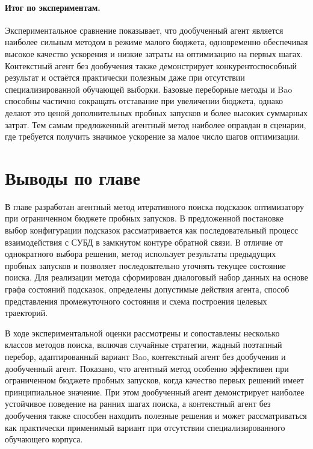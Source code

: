 \paragraph{Итог по экспериментам.}
Экспериментальное сравнение показывает, что дообученный агент является наиболее сильным методом в режиме малого бюджета, одновременно обеспечивая высокое качество ускорения и низкие затраты на оптимизацию на первых шагах. Контекстный агент без дообучения также демонстрирует конкурентоспособный результат и остаётся практически полезным даже при отсутствии специализированной обучающей выборки. Базовые переборные методы и Bao способны частично сокращать отставание при увеличении бюджета, однако делают это ценой дополнительных пробных запусков и более высоких суммарных затрат. Тем самым предложенный агентный метод наиболее оправдан в сценарии, где требуется получить значимое ускорение за малое число шагов оптимизации.

\section{Выводы по главе}\label{sec:ch4_conclusion}

В главе разработан агентный метод итеративного поиска подсказок оптимизатору при ограниченном бюджете пробных запусков. В предложенной постановке выбор конфигурации подсказок рассматривается как последовательный процесс взаимодействия с СУБД в замкнутом контуре обратной связи. В отличие от однократного выбора решения, метод использует результаты предыдущих пробных запусков и позволяет последовательно уточнять текущее состояние поиска. Для реализации метода сформирован диалоговый набор данных на основе графа состояний подсказок, определены допустимые действия агента, способ представления промежуточного состояния и схема построения целевых траекторий.

В ходе экспериментальной оценки рассмотрены и сопоставлены несколько классов методов поиска, включая случайные стратегии, жадный поэтапный перебор, адаптированный вариант Bao, контекстный агент без дообучения и дообученный агент. Показано, что агентный метод особенно эффективен при ограниченном бюджете пробных запусков, когда качество первых решений имеет принципиальное значение. При этом дообученный агент демонстрирует наиболее устойчивое поведение на ранних шагах поиска, а контекстный агент без дообучения также способен находить полезные решения и может рассматриваться как практически применимый вариант при отсутствии специализированного обучающего корпуса.

